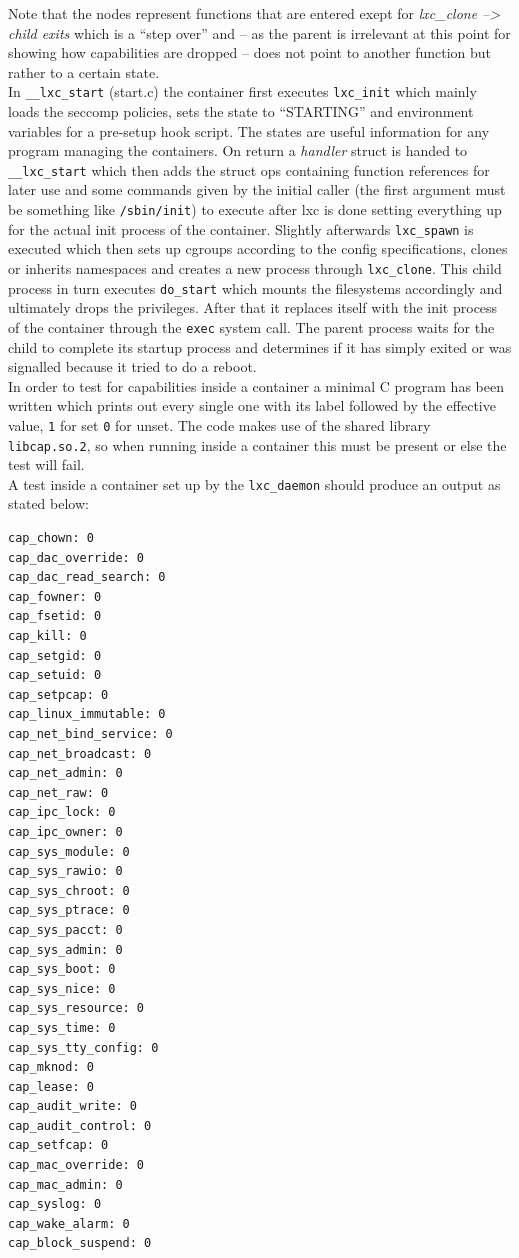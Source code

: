 Note that the nodes represent functions that are entered exept for \textit{lxc\_clone --> child exits} which is a ``step over'' and -- as the parent is
irrelevant at this point for showing how capabilities are dropped -- does not point to another function but rather to a certain state.\\
In \texttt{\_\_lxc\_start} (start.c) the container first executes \texttt{lxc\_init} which mainly loads the seccomp policies,
sets the state to ``STARTING'' and environment variables for a pre-setup hook script. The states are useful information for any program
managing the containers. On return a \textit{handler} struct is handed to
\texttt{\_\_lxc\_start} which then adds the struct ops containing function references for later use and some commands given by the
initial caller (the first argument must be something like \texttt{/sbin/init}) to execute after lxc is done setting everything up for
the actual init process of the container.
Slightly afterwards \texttt{lxc\_spawn} is executed which then sets up cgroups according to the config specifications,
clones or inherits namespaces and creates a new process through \texttt{lxc\_clone}. This child process in turn executes \texttt{do\_start} which
mounts the filesystems accordingly and ultimately drops the privileges. After that it replaces itself with the init process of
the container through the \texttt{exec} system call. The parent process waits for the child to complete its startup process and determines
if it has simply exited or was signalled because it tried to do a reboot.\\
In order to test for capabilities inside a container a minimal C program  has been written which prints out every single one with
its label followed by the effective value, \texttt{1} for set \texttt{0} for unset. The code makes use of the shared library
\texttt{libcap.so.2}, so when running inside a container this must be present or else the test will fail.\\
A test inside a container set up by the \texttt{lxc\_daemon} should produce an output as stated below:
\begin{verbatim}
cap_chown: 0
cap_dac_override: 0
cap_dac_read_search: 0
cap_fowner: 0
cap_fsetid: 0
cap_kill: 0
cap_setgid: 0
cap_setuid: 0
cap_setpcap: 0
cap_linux_immutable: 0
cap_net_bind_service: 0
cap_net_broadcast: 0
cap_net_admin: 0
cap_net_raw: 0
cap_ipc_lock: 0
cap_ipc_owner: 0
cap_sys_module: 0
cap_sys_rawio: 0
cap_sys_chroot: 0
cap_sys_ptrace: 0
cap_sys_pacct: 0
cap_sys_admin: 0
cap_sys_boot: 0
cap_sys_nice: 0
cap_sys_resource: 0
cap_sys_time: 0
cap_sys_tty_config: 0
cap_mknod: 0
cap_lease: 0
cap_audit_write: 0
cap_audit_control: 0
cap_setfcap: 0
cap_mac_override: 0
cap_mac_admin: 0
cap_syslog: 0
cap_wake_alarm: 0
cap_block_suspend: 0
\end{verbatim}

